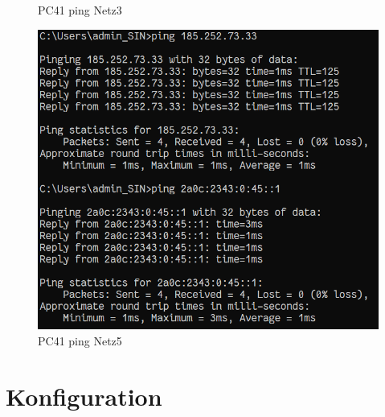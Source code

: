 \documentclass{article}
\begin{document}
\begin{figure}[!htp]
\begin{minipage}[b]{0.3\textwidth}
    \caption{PC41 ping Netz3}
  \end{minipage}
  \hspace{0.8cm}
  \begin{minipage}[b]{0.3\textwidth}
    \includegraphics[width=\textwidth]{Arbeitsergebnisse/PC42/pc41_ping_net5.png}
    \caption{PC41 ping Netz5}
  \end{minipage}
\end{figure}



\section{Konfiguration}

% 
% 
\end{document}
